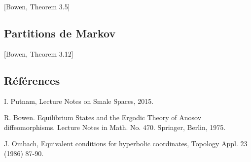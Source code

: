 \documentclass{amsart}
\begin{document}
[Bowen, Theorem 3.5]

\subsection{Partitions de Markov}

[Bowen, Theorem 3.12]

\subsection{R\'ef\'erences}

I. Putnam, Lecture Notes on Smale Spaces, 2015.

R. Bowen. Equilibrium States and the Ergodic Theory of Anosov diffeomorphisms. Lecture Notes in Math. No. 470. Springer, Berlin, 1975.

J. Ombach, Equivalent conditions for hyperbolic coordinates, Topology Appl. 23 (1986) 87-90.
\end{document}
